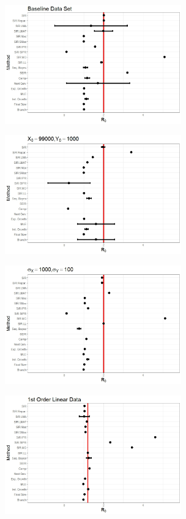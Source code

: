 \documentclass[12pt]{article}
\begin{document}
\begin{minipage}{0.5\linewidth}
	\includegraphics[width=3in]{BaselineFP.jpeg}
\end{minipage}
\begin{minipage}{0.5\linewidth}
	\includegraphics[width=3in]{StartPopFP.jpeg}
\end{minipage}


\begin{minipage}{0.5\linewidth}
	\includegraphics[width=3in]{VarianceFP.jpeg}
\end{minipage}
\begin{minipage}{0.5\linewidth}
	\includegraphics[width=3in]{OtherFP.jpeg}
\end{minipage}
\end{document}
